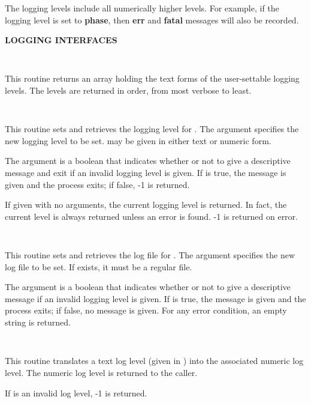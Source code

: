 The logging levels include all numerically higher levels.  For example, if
the logging level is set to {\bf phase}, then {\bf err} and {\bf fatal}
messages will also be recorded.

{\bf LOGGING INTERFACES}

\begin{description}

\item {}\verb" "

This routine returns an array holding the text forms of the user-settable
logging levels.  The levels are returned in order, from most verbose to least.

\item {}\verb" "

This routine sets and retrieves the logging level for .
The  argument specifies the new logging level to be set.
 may be given in either text or numeric form.

The  argument is a boolean that indicates whether or not to give
a descriptive message and exit if an invalid logging level is given.  If
 is true, the message is given and the process exits; if false,
-1 is returned.

If given with no arguments, the current logging level is returned.  In fact,
the current level is always returned unless an error is found.  -1 is returned
on error.

\item {}\verb" "

This routine sets and retrieves the log file for .  The
 argument specifies the new log file to be set.  If 
exists, it must be a regular file.

The  argument is a boolean that indicates whether or not to give
a descriptive message if an invalid logging level is given.  If 
is true, the message is given and the process exits; if false, no message is
given.  For any error condition, an empty string is returned.

\item {}\verb" "

This routine translates a text log level (given in ) into the
associated numeric log level.  The numeric log level is returned to the
caller.

If  is an invalid log level, -1 is returned.


\end{description}
